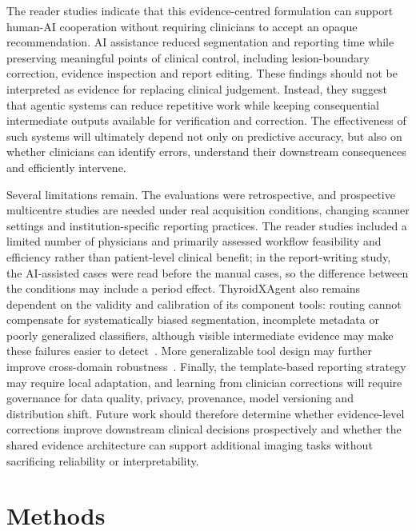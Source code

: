 \documentclass[fleqn,10pt]{wlscirep}
\begin{document}
The reader studies indicate that this evidence-centred formulation can support human-AI cooperation without requiring clinicians to accept an opaque recommendation. AI assistance reduced segmentation and reporting time while preserving meaningful points of clinical control, including lesion-boundary correction, evidence inspection and report editing. These findings should not be interpreted as evidence for replacing clinical judgement. Instead, they suggest that agentic systems can reduce repetitive work while keeping consequential intermediate outputs available for verification and correction. The effectiveness of such systems will ultimately depend not only on predictive accuracy, but also on whether clinicians can identify errors, understand their downstream consequences and efficiently intervene.

Several limitations remain. The evaluations were retrospective, and prospective multicentre studies are needed under real acquisition conditions, changing scanner settings and institution-specific reporting practices. The reader studies included a limited number of physicians and primarily assessed workflow feasibility and efficiency rather than patient-level clinical benefit; in the report-writing study, the AI-assisted cases were read before the manual cases, so the difference between the conditions may include a period effect. ThyroidXAgent also remains dependent on the validity and calibration of its component tools: routing cannot compensate for systematically biased segmentation, incomplete metadata or poorly generalized classifiers, although visible intermediate evidence may make these failures easier to detect~\cite{Wiens2019NatMedDoNoHarm,Obermeyer2019ScienceBias}. More generalizable tool design may further improve cross-domain robustness~\cite{gong2025domain,gong2026intermediate}. Finally, the template-based reporting strategy may require local adaptation, and learning from clinician corrections will require governance for data quality, privacy, provenance, model versioning and distribution shift. Future work should therefore determine whether evidence-level corrections improve downstream clinical decisions prospectively and whether the shared evidence architecture can support additional imaging tasks without sacrificing reliability or interpretability.


\section{Methods}
\end{document}
